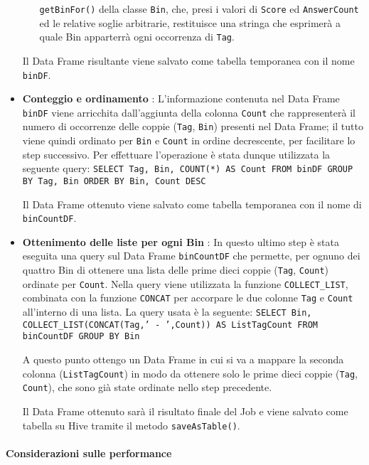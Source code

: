 \begin{itemize}
\begin{itemize}
      \texttt{getBinFor()} della classe \texttt{Bin}, che, presi i valori di \texttt{Score} ed \texttt{AnswerCount} ed le relative
      soglie arbitrarie, restituisce una stringa che esprimerà a quale Bin apparterrà ogni occorrenza di \texttt{Tag}.
    \end{itemize}
    Il Data Frame risultante viene salvato come tabella temporanea con il nome \texttt{binDF}.
    \item \textbf{Conteggio e ordinamento} : L'informazione contenuta nel Data Frame \texttt{binDF} viene arricchita dall'aggiunta
    della colonna \texttt{Count} che rappresenterà il numero di occorrenze delle coppie (\texttt{Tag}, \texttt{Bin}) presenti
    nel Data Frame; il tutto viene quindi ordinato per \texttt{Bin} e \texttt{Count} in ordine decrescente, per facilitare lo step
    successivo.
    Per effettuare l'operazione è stata dunque utilizzata la seguente query:
    \texttt{SELECT Tag, Bin, COUNT(*) AS Count FROM binDF GROUP BY Tag, Bin ORDER BY Bin, Count DESC}

    Il Data Frame ottenuto viene salvato come tabella temporanea con il nome di \texttt{binCountDF}.
    \item \textbf{Ottenimento delle liste per ogni Bin} : In questo ultimo step è stata eseguita una query sul Data Frame
    \texttt{binCountDF} che permette, per ognuno dei quattro Bin di ottenere una lista delle prime dieci coppie
    (\texttt{Tag}, \texttt{Count}) ordinate per \texttt{Count}.
    Nella query viene utilizzata la funzione \texttt{COLLECT\_LIST}, combinata con la funzione \texttt{CONCAT} per accorpare
    le due colonne \texttt{Tag} e \texttt{Count} all'interno di una lista.
    La query usata è la seguente:
    \texttt{SELECT Bin, COLLECT\_LIST(CONCAT(Tag,' - ',Count)) AS ListTagCount FROM binCountDF GROUP BY Bin}

    A questo punto ottengo un Data Frame in cui si va a mappare la seconda colonna (\texttt{ListTagCount}) in modo da ottenere
    solo le prime dieci coppie (\texttt{Tag}, \texttt{Count}), che sono già state ordinate nello step precedente.

    Il Data Frame ottenuto sarà il risultato finale del Job e viene salvato come tabella su Hive tramite il metodo
    \texttt{saveAsTable()}.
  \end{itemize}


  \paragraph{Considerazioni sulle performance}\label{par:job2:spark:performance}

